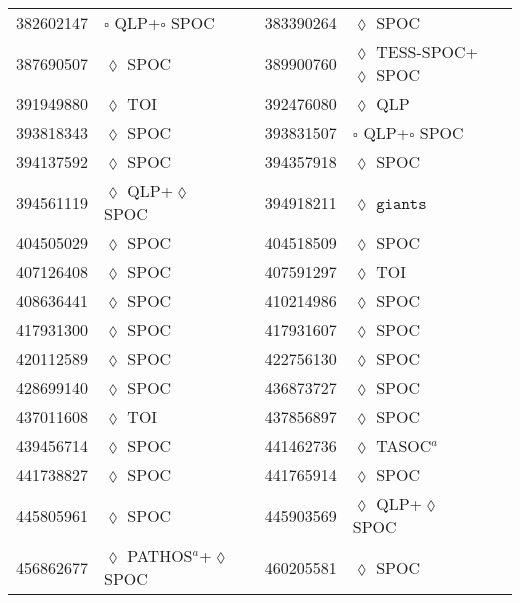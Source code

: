 \begin{longtable}{llrllr}
382602147 & $\square$ QLP+$\square$ SPOC & \cite{TIC_201177276} & 383390264 & $\lozenge$ SPOC & \cite{TIC_383390264} \\
387690507 & $\lozenge$ SPOC & \cite{TIC_387690507} & 389900760 & $\lozenge$ TESS-SPOC+$\lozenge$ SPOC & \cite{TIC_343628284} \\
391949880 & $\lozenge$ TOI & \cite{TIC_154872375} & 392476080 & $\lozenge$ QLP & \cite{TIC_392476080} \\
393818343 & $\lozenge$ SPOC & \cite{TIC_393818343} & 393831507 & $\square$ QLP+$\square$ SPOC & \cite{TIC_393831507} \\
394137592 & $\lozenge$ SPOC & \cite{TIC_394137592} & 394357918 & $\lozenge$ SPOC & \cite{TIC_441738827} \\
394561119 & $\lozenge$ QLP+$\lozenge$ SPOC & \cite{TIC_394561119} & 394918211 & $\lozenge$ $\texttt{giants}$ & \cite{TIC_394918211} \\
404505029 & $\lozenge$ SPOC & \cite{TIC_404505029} & 404518509 & $\lozenge$ SPOC & \cite{TIC_404518509} \\
407126408 & $\lozenge$ SPOC & \cite{TIC_428699140} & 407591297 & $\lozenge$ TOI & \cite{TIC_154872375} \\
408636441 & $\lozenge$ SPOC & \cite{TIC_408636441} & 410214986 & $\lozenge$ SPOC & \cite{TIC_410214986} \\
417931300 & $\lozenge$ SPOC & \cite{TIC_159418353} & 417931607 & $\lozenge$ SPOC & \cite{TIC_232540264} \\
420112589 & $\lozenge$ SPOC & \cite{TIC_420112589} & 422756130 & $\lozenge$ SPOC & \cite{TIC_422756130} \\
428699140 & $\lozenge$ SPOC & \cite{TIC_428699140} & 436873727 & $\lozenge$ SPOC & \cite{TIC_436873727} \\
437011608 & $\lozenge$ TOI & \cite{TIC_154872375} & 437856897 & $\lozenge$ SPOC & \cite{TIC_437856897} \\
439456714 & $\lozenge$ SPOC & \cite{TIC_439456714} & 441462736 & $\lozenge$ TASOC$^a$ & \cite{TIC_441462736} \\
441738827 & $\lozenge$ SPOC & \cite{TIC_441738827} & 441765914 & $\lozenge$ SPOC & \cite{TIC_232540264} \\
445805961 & $\lozenge$ SPOC & \cite{TIC_445805961} & 445903569 & $\lozenge$ QLP+$\lozenge$ SPOC & \cite{TIC_445903569} \\
456862677 & $\lozenge$ PATHOS$^a$+$\lozenge$ SPOC & \cite{TIC_456862677} & 460205581 & $\lozenge$ SPOC & \cite{TIC_460205581} \\

\end{longtable}

